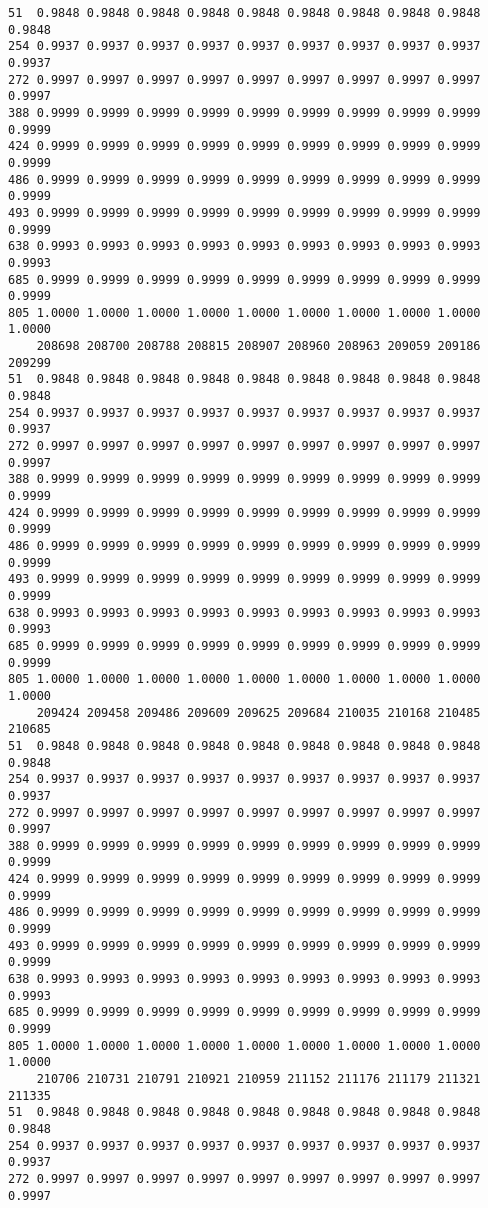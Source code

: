 \documentclass[
]{report}
\begin{document}
\begin{verbatim}
51  0.9848 0.9848 0.9848 0.9848 0.9848 0.9848 0.9848 0.9848 0.9848 0.9848
254 0.9937 0.9937 0.9937 0.9937 0.9937 0.9937 0.9937 0.9937 0.9937 0.9937
272 0.9997 0.9997 0.9997 0.9997 0.9997 0.9997 0.9997 0.9997 0.9997 0.9997
388 0.9999 0.9999 0.9999 0.9999 0.9999 0.9999 0.9999 0.9999 0.9999 0.9999
424 0.9999 0.9999 0.9999 0.9999 0.9999 0.9999 0.9999 0.9999 0.9999 0.9999
486 0.9999 0.9999 0.9999 0.9999 0.9999 0.9999 0.9999 0.9999 0.9999 0.9999
493 0.9999 0.9999 0.9999 0.9999 0.9999 0.9999 0.9999 0.9999 0.9999 0.9999
638 0.9993 0.9993 0.9993 0.9993 0.9993 0.9993 0.9993 0.9993 0.9993 0.9993
685 0.9999 0.9999 0.9999 0.9999 0.9999 0.9999 0.9999 0.9999 0.9999 0.9999
805 1.0000 1.0000 1.0000 1.0000 1.0000 1.0000 1.0000 1.0000 1.0000 1.0000
    208698 208700 208788 208815 208907 208960 208963 209059 209186 209299
51  0.9848 0.9848 0.9848 0.9848 0.9848 0.9848 0.9848 0.9848 0.9848 0.9848
254 0.9937 0.9937 0.9937 0.9937 0.9937 0.9937 0.9937 0.9937 0.9937 0.9937
272 0.9997 0.9997 0.9997 0.9997 0.9997 0.9997 0.9997 0.9997 0.9997 0.9997
388 0.9999 0.9999 0.9999 0.9999 0.9999 0.9999 0.9999 0.9999 0.9999 0.9999
424 0.9999 0.9999 0.9999 0.9999 0.9999 0.9999 0.9999 0.9999 0.9999 0.9999
486 0.9999 0.9999 0.9999 0.9999 0.9999 0.9999 0.9999 0.9999 0.9999 0.9999
493 0.9999 0.9999 0.9999 0.9999 0.9999 0.9999 0.9999 0.9999 0.9999 0.9999
638 0.9993 0.9993 0.9993 0.9993 0.9993 0.9993 0.9993 0.9993 0.9993 0.9993
685 0.9999 0.9999 0.9999 0.9999 0.9999 0.9999 0.9999 0.9999 0.9999 0.9999
805 1.0000 1.0000 1.0000 1.0000 1.0000 1.0000 1.0000 1.0000 1.0000 1.0000
    209424 209458 209486 209609 209625 209684 210035 210168 210485 210685
51  0.9848 0.9848 0.9848 0.9848 0.9848 0.9848 0.9848 0.9848 0.9848 0.9848
254 0.9937 0.9937 0.9937 0.9937 0.9937 0.9937 0.9937 0.9937 0.9937 0.9937
272 0.9997 0.9997 0.9997 0.9997 0.9997 0.9997 0.9997 0.9997 0.9997 0.9997
388 0.9999 0.9999 0.9999 0.9999 0.9999 0.9999 0.9999 0.9999 0.9999 0.9999
424 0.9999 0.9999 0.9999 0.9999 0.9999 0.9999 0.9999 0.9999 0.9999 0.9999
486 0.9999 0.9999 0.9999 0.9999 0.9999 0.9999 0.9999 0.9999 0.9999 0.9999
493 0.9999 0.9999 0.9999 0.9999 0.9999 0.9999 0.9999 0.9999 0.9999 0.9999
638 0.9993 0.9993 0.9993 0.9993 0.9993 0.9993 0.9993 0.9993 0.9993 0.9993
685 0.9999 0.9999 0.9999 0.9999 0.9999 0.9999 0.9999 0.9999 0.9999 0.9999
805 1.0000 1.0000 1.0000 1.0000 1.0000 1.0000 1.0000 1.0000 1.0000 1.0000
    210706 210731 210791 210921 210959 211152 211176 211179 211321 211335
51  0.9848 0.9848 0.9848 0.9848 0.9848 0.9848 0.9848 0.9848 0.9848 0.9848
254 0.9937 0.9937 0.9937 0.9937 0.9937 0.9937 0.9937 0.9937 0.9937 0.9937
272 0.9997 0.9997 0.9997 0.9997 0.9997 0.9997 0.9997 0.9997 0.9997 0.9997

\end{verbatim}
\end{document}
